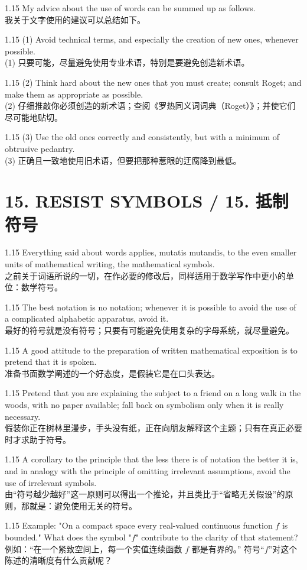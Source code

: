 \documentclass[12pt,a4paper]{article}
\newcommand{\bilingual}[2]{
    \begin{spacing}{1.15} %
        \noindent \normalsize #1 \\[-0.5ex] %
        \small \textcolor{blue!70!black}{#2} %
    \end{spacing}
    \vspace{0.8em} %
}
\begin{document}
\bilingual{My advice about the use of words can be summed up as follows.}
{我关于文字使用的建议可以总结如下。} %

\bilingual{(1) Avoid technical terms, and especially the creation of new ones, whenever possible.}
{(1) 只要可能，尽量避免使用专业术语，特别是要避免创造新术语。} %

\bilingual{(2) Think hard about the new ones that you must create; consult Roget; and make them as appropriate as possible.}
{(2) 仔细推敲你必须创造的新术语；查阅《罗热同义词词典（Roget）》；并使它们尽可能地贴切。} %

\bilingual{(3) Use the old ones correctly and consistently, but with a minimum of obtrusive pedantry.}
{(3) 正确且一致地使用旧术语，但要把那种惹眼的迂腐降到最低。} %

\section*{15. RESIST SYMBOLS / 15. 抵制符号} %

\bilingual{Everything said about words applies, mutatis mutandis, to the even smaller units of mathematical writing, the mathematical symbols.}
{之前关于词语所说的一切，在作必要的修改后，同样适用于数学写作中更小的单位：数学符号。} %

\bilingual{The best notation is no notation; whenever it is possible to avoid the use of a complicated alphabetic apparatus, avoid it.}
{最好的符号就是没有符号；只要有可能避免使用复杂的字母系统，就尽量避免。} %

\bilingual{A good attitude to the preparation of written mathematical exposition is to pretend that it is spoken.}
{准备书面数学阐述的一个好态度，是假装它是在口头表达。} %

\bilingual{Pretend that you are explaining the subject to a friend on a long walk in the woods, with no paper available; fall back on symbolism only when it is really necessary.}
{假装你正在树林里漫步，手头没有纸，正在向朋友解释这个主题；只有在真正必要时才求助于符号。} %

\bilingual{A corollary to the principle that the less there is of notation the better it is, and in analogy with the principle of omitting irrelevant assumptions, avoid the use of irrelevant symbols.}
{由“符号越少越好”这一原则可以得出一个推论，并且类比于“省略无关假设”的原则，那就是：避免使用无关的符号。} %

\bilingual{Example: "On a compact space every real-valued continuous function $f$ is bounded." What does the symbol "$f$" contribute to the clarity of that statement?}
{例如：“在一个紧致空间上，每一个实值连续函数 $f$ 都是有界的。” 符号“$f$”对这个陈述的清晰度有什么贡献呢？} %
\end{document}
